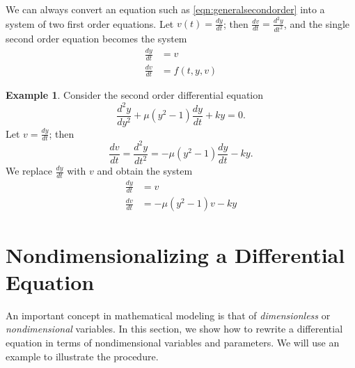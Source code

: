 \documentclass[reqno]{immbook}
\numberwithin{equation}{chapter}
\numberwithin{question}{section}
\numberwithin{theorem}{chapter}
\numberwithin{figure}{chapter}
\theoremstyle{definition}
\newtheorem{example}{Example}[section]
\begin{document}
We can always convert an equation such as
\eqref{eqn:generalsecondorder}
into a system of two first order equations.
Let $v(t) = \frac{dy}{dt}$; then
$\frac{dv}{dt} = \frac{d^2y}{dt^2}$, and the single second
order equation becomes the system
\begin{equation}
\begin{split}
   \frac{dy}{dt} & = v\\
   \frac{dv}{dt} & = f(t,y,v)
\end{split}
\end{equation}
\begin{example}
Consider the second order differential equation
\begin{equation}
  \frac{d^2y}{dy^2} + \mu(y^2-1)\frac{dy}{dt} + k y = 0.
\end{equation}
Let $v = \frac{dy}{dt}$;
then
\begin{equation}
   \frac{dv}{dt} = \frac{d^2y}{dt^2} = -\mu(y^2-1)\frac{dy}{dt} - ky.
\end{equation}
We replace $\frac{dy}{dt}$ with $v$ and obtain the system
\begin{equation}
\begin{split}
   \frac{dy}{dt} & = v \\
   \frac{dv}{dt} & =  -\mu(y^2-1)v - ky
\end{split}
\end{equation}
\end{example}

\newpage

\section{Nondimensionalizing a Differential Equation}

An important concept in mathematical modeling
is that of \emph{dimensionless} or 
\emph{nondimensional} variables.
In this section, we show how to rewrite a differential
equation in terms of nondimensional variables and parameters.
We will use an example to illustrate the procedure.
\end{document}
